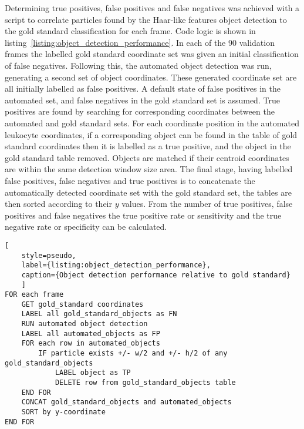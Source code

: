 Determining true positives, false positives and false negatives was achieved with a script to correlate particles found by the Haar-like features object detection to the gold standard classification for each frame. Code logic is shown in listing~\ref{listing:object_detection_performance}. In each of the 90 validation frames the labelled gold standard coordinate set was given an initial classification of false negatives. Following this, the automated object detection was run, generating a second set of object coordinates. These generated coordinate set are all initially labelled as false positives. A default state of false positives in the automated set, and false negatives in the gold standard set is assumed. True positives are found by searching for corresponding coordinates between the automated and gold standard sets. For each coordinate position in the automated leukocyte coordinates, if a corresponding object can be found in the table of gold standard coordinates then it is labelled as a true positive, and the object in the gold standard table removed. Objects are matched if their centroid coordinates are within the same detection window size area. The final stage, having labelled false positives, false negatives and true positives is to concatenate the automatically detected coordinate set with the gold standard set, the tables are then sorted according to their $y$ values. From the number of true positives, false positives and false negatives the true positive rate or sensitivity and the true negative rate or specificity can be calculated.

\begin{lstlisting}[
	style=pseudo,
	label={listing:object_detection_performance},
	caption={Object detection performance relative to gold standard}
	]
FOR each frame
	GET gold_standard coordinates
	LABEL all gold_standard_objects as FN
	RUN automated object detection
	LABEL all automated_objects as FP
	FOR each row in automated_objects
		IF particle exists +/- w/2 and +/- h/2 of any gold_standard_objects
			LABEL object as TP
			DELETE row from gold_standard_objects table
	END FOR
	CONCAT gold_standard_objects and automated_objects
	SORT by y-coordinate
END FOR
\end{lstlisting}

